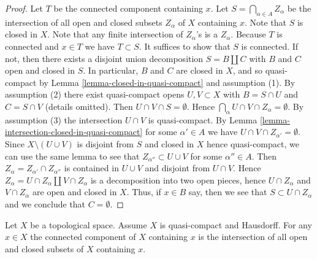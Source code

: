 \begin{proof}
Let $T$ be the connected component containing $x$.
Let $S = \bigcap_{\alpha \in A} Z_\alpha$ be the intersection of all
open and closed subsets $Z_\alpha$ of $X$ containing $x$.
Note that $S$ is closed in $X$.
Note that any finite intersection of $Z_\alpha$'s is a $Z_\alpha$.
Because $T$ is connected and $x \in T$ we have $T \subset S$.
It suffices to show that $S$ is connected.
If not, then there exists a disjoint union decomposition
$S = B \amalg C$ with $B$ and $C$ open and closed in $S$.
In particular, $B$ and $C$ are closed in $X$, and so quasi-compact by
Lemma \ref{lemma-closed-in-quasi-compact} and assumption (1).
By assumption (2) there exist quasi-compact opens
$U, V \subset X$ with $B = S \cap U$ and $C = S \cap V$ (details omitted).
Then $U \cap V \cap S = \emptyset$.
Hence $\bigcap_\alpha U \cap V \cap Z_\alpha = \emptyset$.
By assumption (3) the intersection $U \cap V$ is quasi-compact.
By Lemma \ref{lemma-intersection-closed-in-quasi-compact}
for some $\alpha' \in A$ we have $U \cap V \cap Z_{\alpha'} = \emptyset$.
Since $X \setminus (U \cup V)$ is disjoint from $S$
and closed in $X$ hence quasi-compact, we can use the same lemma
to see that $Z_{\alpha''} \subset U \cup V$ for some $\alpha'' \in A$.
Then $Z_\alpha = Z_{\alpha'} \cap Z_{\alpha''}$ is contained
in $U \cup V$ and disjoint from $U \cap V$.
Hence $Z_\alpha = U \cap Z_\alpha \amalg V \cap Z_\alpha$
is a decomposition into two open pieces,
hence $U \cap Z_\alpha$ and $V \cap Z_\alpha$ are open and closed in $X$.
Thus, if $x \in B$ say, then we see that $S \subset U \cap Z_\alpha$
and we conclude that $C = \emptyset$.
\end{proof}

\begin{lemma}
\label{lemma-connected-component-intersection-compact-Hausdorff}
Let $X$ be a topological space. Assume $X$ is quasi-compact and Hausdorff.
For any $x \in X$ the connected component of $X$ containing
$x$ is the intersection of all open and closed subsets
of $X$ containing $x$.
\end{lemma}

